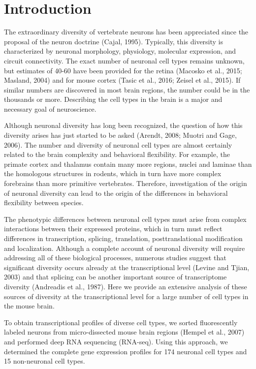 \section{Introduction}


The extraordinary diversity of vertebrate neurons has been appreciated since the proposal of the neuron doctrine (Cajal, 1995). Typically, this diversity is characterized by neuronal morphology, physiology, molecular expression, and circuit connectivity. The exact number of neuronal cell types remains unknown, but estimates of 40-60 have been provided for the retina (Macosko et al., 2015; Masland, 2004) and for mouse cortex (Tasic et al., 2016; Zeisel et al., 2015). If similar numbers are discovered in most brain regions, the number could be in the thousands or more. Describing the cell types in the brain is a major and necessary goal of neuroscience.

Although neuronal diversity has long been recognized, the question of how this diversity arises has just started to be asked (Arendt, 2008; Muotri and Gage, 2006). The number and diversity of neuronal cell types are almost certainly related to the brain complexity and behavioral flexibility. For example, the primate cortex and thalamus contain many more regions, nuclei and laminae than the homologous structures in rodents, which in turn have more complex forebrains than more primitive vertebrates. Therefore, investigation of the origin of neuronal diversity can lead to the origin of the differences in behavioral flexibility between species. 

The phenotypic differences between neuronal cell types must arise from complex interactions between their expressed proteins, which in turn must reflect differences in transcription, splicing, translation, posttranslational modification and localization. Although a complete account of neuronal diversity will require addressing all of these biological processes, numerous studies suggest that significant diversity occurs already at the transcriptional level (Levine and Tjian, 2003) and that splicing can be another important source of transcriptome diversity (Andreadis et al., 1987). Here we provide an extensive analysis of these sources of diversity at the transcriptional level for a large number of cell types in the mouse brain.

To obtain transcriptional profiles of diverse cell types, we sorted fluorescently labeled neurons from micro-dissected mouse brain regions  (Hempel et al., 2007) and performed deep RNA sequencing (RNA-seq). Using this approach, we determined the complete gene expression profiles for 174 neuronal cell types and 15 non-neuronal cell types.


